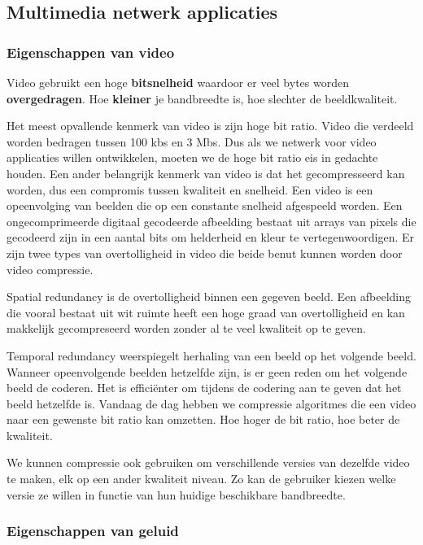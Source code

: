 \subsection{Multimedia netwerk applicaties}

\subsubsection{Eigenschappen van video}

\noindent Video gebruikt een hoge \textbf{bitsnelheid} waardoor er veel bytes worden \textbf{overgedragen}. Hoe \textbf{kleiner} je bandbreedte is, hoe slechter de beeldkwaliteit.

\noindent Het meest opvallende kenmerk van video is zijn hoge bit ratio. Video die verdeeld worden bedragen tussen 100 kbs en 3 Mbs. Dus als we netwerk voor video applicaties willen ontwikkelen, moeten we de hoge bit ratio eis in gedachte houden. Een ander belangrijk kenmerk van video is dat het gecompresseerd kan worden, dus een compromis tussen kwaliteit en snelheid. Een video is een opeenvolging van beelden die op een constante snelheid afgespeeld worden. Een ongecomprimeerde digitaal gecodeerde afbeelding bestaat uit arrays van pixels die gecodeerd zijn in een aantal bits om helderheid en kleur te vertegenwoordigen. Er zijn twee types van overtolligheid in video die beide benut kunnen worden door video compressie.

\noindent Spatial redundancy is de overtolligheid binnen een gegeven beeld. Een afbeelding die vooral bestaat uit wit ruimte heeft een hoge graad van overtolligheid en kan makkelijk gecompreseerd worden zonder al te veel kwaliteit op te geven.

\noindent Temporal redundancy weerspiegelt herhaling van een beeld op het volgende beeld. Wanneer opeenvolgende beelden hetzelfde zijn, is er geen reden om het volgende beeld de coderen. Het is efficiënter om tijdens de codering aan te geven dat het beeld hetzelfde is.
Vandaag de dag hebben we compressie algoritmes die een video naar een gewenste bit ratio kan omzetten. Hoe hoger de bit ratio, hoe beter de kwaliteit.

\noindent We kunnen compressie ook gebruiken om verschillende versies van dezelfde video te maken, elk op een ander kwaliteit niveau. Zo kan de gebruiker kiezen welke versie ze willen in functie van hun huidige beschikbare bandbreedte.

\subsubsection{Eigenschappen van geluid}

